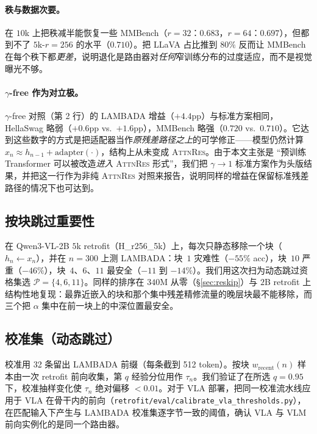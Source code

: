 \documentclass{article}
\newcommand{\attnres}{\textsc{AttnRes}}
\begin{document}
\paragraph{秩与数据次要。} 在 $10$k 上把秩减半能恢复一些 MMBench（$r{=}32$：$0.683$，$r{=}64$：$0.697$），但都到不了 $5$k-$r{=}256$ 的水平（$0.710$）。把 LLaVA 占比推到 $80\%$ 反而让 MMBench 在每个秩下都\emph{更差}，说明退化是路由器对\emph{任何}窄训练分布的过度适应，而不是视觉曝光不够。

\paragraph{$\gamma$-free 作为对立极。} $\gamma$-free 对照（第 2 行）的 LAMBADA 增益（$+4.4$pp）与标准方案相同，HellaSwag 略弱（$+0.6$pp vs.\ $+1.6$pp），MMBench 略强（$0.720$ vs.\ $0.710$）。它达到这些数字的方式是把适配器当作\emph{原残差路径之上}的可学修正——模型仍然计算 $x_n \approx h_{n-1} + \mathrm{adapter}(\cdot)$，结构上从未变成 \attnres{}。由于本文主张是 ``预训练 Transformer 可以被改造\emph{进入} \attnres{} 形式''，我们把 $\gamma{\to}1$ 标准方案作为头版结果，并把这一行作为非纯 \attnres{} 对照来报告，说明同样的增益在保留标准残差路径的情况下也可达到。

\subsection{按块跳过重要性}
\label{app:block_removal}
在 Qwen3-VL-2B $5$k retrofit（H\_r256\_5k）上，每次只静态移除一个块（$h_n \leftarrow x_n$），并在 $n{=}300$ 上测 LAMBADA：块~$1$ 灾难性（$-55\%$ acc），块~$10$ 严重（$-46\%$），块~$4$、$6$、$11$ 最安全（$-11$ 到 $-14\%$）。我们用这次扫为动态跳过资格集选 $\mathcal{P}{=}\{4,6,11\}$。同样的排序在 $340$M 从零（\S\ref{sec:reskip}）与 $2$B retrofit 上结构性地复现：最靠近嵌入的块和那个集中残差精修流量的晚层块最不能移除，而三个把 $\alpha$ 集中在前一块上的中深位置最安全。

\subsection{校准集（动态跳过）}
\label{app:calibration}
校准用 32 条留出 LAMBADA 前缀（每条截到 512 token）。按块 $w_{\text{recent}}(n)$ 样本由一次 retrofit 前向收集，第 $q$ 经验分位用作 $\tau_n$。我们验证了在所选 $q{=}0.95$ 下，校准抽样变化使 $\tau_n$ 绝对偏移 $<0.01$。对于 VLA 部署，把同一校准流水线应用于 VLA 在骨干内的前向（\texttt{retrofit/eval/calibrate\_vla\_thresholds.py}），在匹配输入下产生与 LAMBADA 校准集逐字节一致的阈值，确认 VLA 与 VLM 前向实例化的是同一个路由器。
\end{document}
